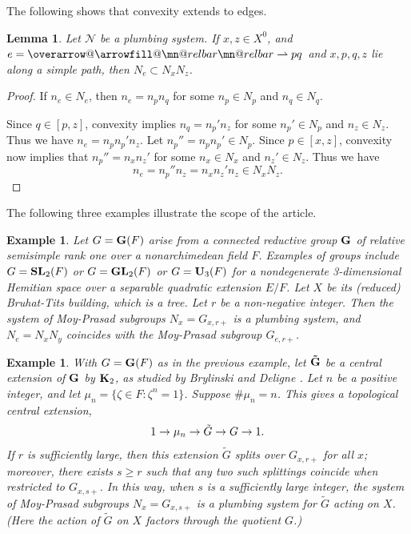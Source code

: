 \documentclass[letter]{amsart}
\makeatletter
\newtheorem{lemma}[thm]{Lemma}
\newtheorem{example}[thm]{Example}
\theoremstyle{definition}
\theoremstyle{remark}
\numberwithin{thm}{section}
\numberwithin{equation}{section}
\DeclareRobustCommand{\overrightharpoon}{\mathpalette{\overarrow@\rightharpoonfill@}}
\def\rightharpoonfill@{\arrowfill@\mn@relbar\mn@relbar\rightharpoonup}
\newcommand{\edge}[1]{\overrightharpoon{#1}}
\renewcommand{\NN}{{\mathcal N}}
\makeatother
\begin{document}
The following shows that convexity extends to edges.
\begin{lemma}
\label{convex-edges}
Let $\NN$ be a plumbing system.  If $x,z \in X^0$, and $e = \edge{pq}$ and $x, p, q, z$ lie along a simple path, then $N_e \subset N_x N_z$.  
\end{lemma}
\begin{proof}
If $n_e \in N_e$, then $n_e = n_p n_q$ for some $n_p \in N_p$ and $n_q \in N_q$.  
\begin{center}
\end{center}
Since $q \in [p,z]$, convexity implies $n_q = n_p' n_z$ for some $n_p' \in N_p$ and $n_z \in N_z$.  Thus we have $n_e = n_p n_p' n_z$.  Let $n_p'' = n_p n_p' \in N_p$.  Since $p \in [x,z]$, convexity now implies that $n_p'' = n_x n_z'$ for some $n_x \in N_x$ and $n_z' \in N_z$.  Thus we have 
$$n_e = n_p'' n_z = n_x n_z' n_z \in N_x N_z.$$
\end{proof}

The following three examples illustrate the scope of the article.

\begin{example}
\label{Ex1}
Let $G = \boldsymbol{\mathrm{G}}(F)$ arise from a connected reductive group $\boldsymbol{\mathrm{G}}$ of relative semisimple rank one over a nonarchimedean field $F$.  Examples of groups include $G = \boldsymbol{\mathrm{SL}}_2(F)$ or $G = \boldsymbol{\mathrm{GL}}_2(F)$ or $G = \boldsymbol{\mathrm{U}}_3(F)$ for a nondegenerate 3-dimensional Hemitian space over a separable quadratic extension $E/F$.  Let $X$ be its (reduced) Bruhat-Tits building, which is a tree.  Let $r$ be a non-negative integer.  Then the system of Moy-Prasad subgroups $N_x = G_{x,r+}$ is a plumbing system, and $N_e = N_x N_y$ coincides with the Moy-Prasad subgroup $G_{e,r+}$.
\end{example}

\begin{example}
\label{Ex2}
With $G = \boldsymbol{\mathrm{G}}(F)$ as in the previous example, let $\boldsymbol{\mathrm{\tilde G}}$ be a central extension of $\boldsymbol{\mathrm{G}}$ by $\boldsymbol{\mathrm{K}}_2$, as studied by Brylinski and Deligne \cite{BD}.  Let $n$ be a positive integer, and let $\mu_n = \{ \zeta \in F : \zeta^n = 1 \}$.  Suppose $\# \mu_n = n$.  This gives a topological central extension,
$$1 \rightarrow \mu_n \rightarrow \tilde G \rightarrow G \rightarrow 1.$$
If $r$ is sufficiently large, then this extension $\tilde G$ splits over $G_{x,r+}$ for all $x$; moreover, there exists $s \geq r$ such that any two such splittings coincide when restricted to $G_{x,s+}$.  In this way, when $s$ is a sufficiently large integer, the system of Moy-Prasad subgroups $N_x = G_{x,s+}$ is a plumbing system for $\tilde G$ acting on $X$.  (Here the action of $\tilde G$ on $X$ factors through the quotient $G$.) 
\end{example}
\end{document}
